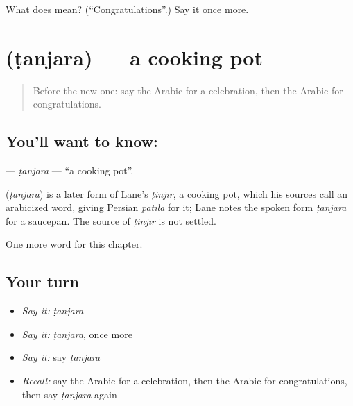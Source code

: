 \begin{tcolorbox}[breakable,colback=teal!4,colframe=teal!35!black,title={Before you move on}]
What does  mean? (\textquotedblleft{}Congratulations\textquotedblright{}.) Say it once more.
\end{tcolorbox}
\section[\texorpdfstring{\ar{طنجرة} (ṭanjara)}{طنجرة (ṭanjara)}]{ (ṭanjara) — a cooking pot}

\label{lesson:AR-C249-tanjara}



\begin{quote}
Before the new one: say the Arabic for a celebration, then the Arabic for congratulations.
\end{quote}

\subsection*{You'll want to know: }
\textbf{} — \emph{ṭanjara} — \textquotedblleft{}a cooking pot\textquotedblright{}.

\begin{cousinweb}
\textbf{} (\emph{ṭanjara}) is a later form of Lane's \emph{ṭinjīr}, a cooking pot, which his sources call an arabicized word, giving Persian \emph{pātīla} for it; Lane notes the spoken form \emph{ṭanjara} for a saucepan. The source of \emph{ṭinjīr} is not settled.
\end{cousinweb}

\begin{grammarlens}[title={What you've built}]
One more word for this chapter.
\end{grammarlens}

\subsection*{Your turn}
\begin{itemize}
\raggedright
  \item \emph{Say it:} \emph{ṭanjara}
  \item \emph{Say it:} \emph{ṭanjara}, once more
  \item \emph{Say it:} say \emph{ṭanjara}
  \item \emph{Recall:} say the Arabic for a celebration, then the Arabic for congratulations, then say \emph{ṭanjara} again
\end{itemize}

